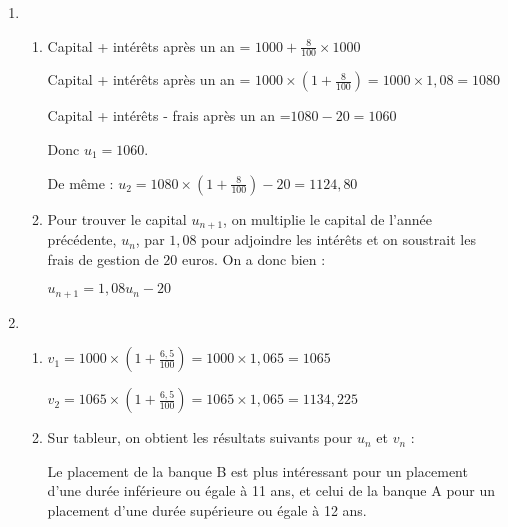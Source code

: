 \begin{corrige}
     \begin{enumerate}
          \item
          \begin{enumerate}[label=\alph*.]
               \item
               Capital + intérêts après un an  = $1000 + \frac{8}{100}\times 1000$
               \par
               Capital + intérêts après un an  = $1000\times \left(1+\frac{8}{100}\right)=1000\times 1,08=1080$
               \par
               Capital + intérêts - frais après un an =$1080-20 = 1060$
               \par
               Donc $u_{1}=1060$.
               \par
               De même : $u_{2}=1080\times \left(1+\frac{8}{100}\right)-20 = 1124,80$
               \item
               Pour trouver le capital $u_{n+1}$, on multiplie le capital de l'année précédente, $u_{n}$, par $1,08$ pour adjoindre les intérêts et on soustrait les frais de gestion de $20$ euros. On a donc bien :
               \par
               $u_{n+1}=1,08u_{n}-20$
          \end{enumerate}
          \item
          \begin{enumerate}[label=\alph*.]
               \item
               $v_{1}=1000\times \left(1+\frac{6,5}{100}\right)=1000\times 1,065=1065$
               \par
               $v_{2}=1065\times \left(1+\frac{6,5}{100}\right)=1065\times 1,065=1134,225$
               \item
               Sur tableur, on obtient les résultats suivants pour $u_{n}$ et $v_{n}$ :

\begin{center}
\end{center}
               Le placement de la banque B est plus intéressant pour un placement d'une durée inférieure ou égale à 11 ans, et celui de la banque A pour un placement d'une durée supérieure ou égale à 12 ans.
          \end{enumerate}
     \end{enumerate}
\end{corrige}

